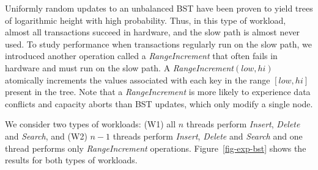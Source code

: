 Uniformly random updates to an unbalanced BST have been proven to yield trees of logarithmic height with high probability.
Thus, in this type of workload, almost all transactions succeed in hardware, and the slow path is almost never used.
To study performance when transactions regularly run on the slow path, we introduced another operation called a \textit{RangeIncrement} that often fails in hardware and must run on the slow path.
A \textit{RangeIncrement}$(low, hi)$ atomically increments the values 
associated with each key in the range $[low, hi]$ present in the tree.
Note that a \textit{RangeIncrement} is more likely to experience data 
conflicts and capacity aborts than BST updates, which only modify a single node.

We consider two types of workloads: (W1) all $n$ threads perform \textit{Insert}, \textit{Delete} and \textit{Search}, and (W2) $n-1$ threads perform \textit{Insert}, \textit{Delete} and \textit{Search} and one thread performs only \textit{RangeIncrement} operations.
Figure~\ref{fig-exp-bst} shows the results for both types of workloads.


